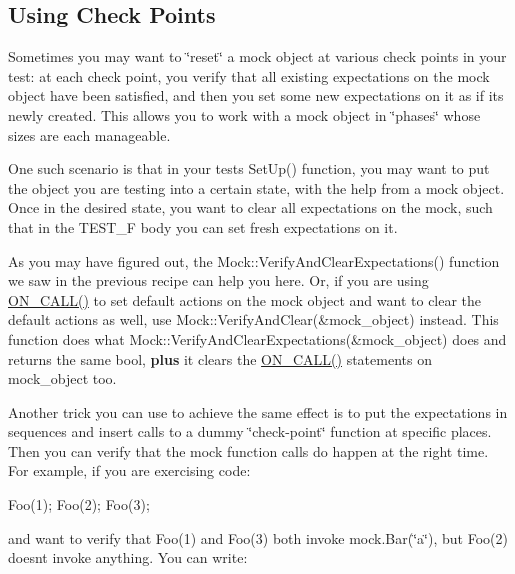 \subsection*{Using Check Points}

Sometimes you may want to \char`\"{}reset\char`\"{} a mock object at various check points in your test\+: at each check point, you verify that all existing expectations on the mock object have been satisfied, and then you set some new expectations on it as if it\textquotesingle{}s newly created. This allows you to work with a mock object in \char`\"{}phases\char`\"{} whose sizes are each manageable.

One such scenario is that in your test\textquotesingle{}s {\ttfamily Set\+Up()} function, you may want to put the object you are testing into a certain state, with the help from a mock object. Once in the desired state, you want to clear all expectations on the mock, such that in the {\ttfamily T\+E\+S\+T\+\_\+F} body you can set fresh expectations on it.

As you may have figured out, the {\ttfamily Mock\+::\+Verify\+And\+Clear\+Expectations()} function we saw in the previous recipe can help you here. Or, if you are using {\ttfamily \hyperlink{gmock-spec-builders_8h_a5b12ae6cf84f0a544ca811b380c37334}{O\+N\+\_\+\+C\+A\+L\+L()}} to set default actions on the mock object and want to clear the default actions as well, use {\ttfamily Mock\+::\+Verify\+And\+Clear(\&mock\+\_\+object)} instead. This function does what {\ttfamily Mock\+::\+Verify\+And\+Clear\+Expectations(\&mock\+\_\+object)} does and returns the same {\ttfamily bool}, {\bfseries plus} it clears the {\ttfamily \hyperlink{gmock-spec-builders_8h_a5b12ae6cf84f0a544ca811b380c37334}{O\+N\+\_\+\+C\+A\+L\+L()}} statements on {\ttfamily mock\+\_\+object} too.

Another trick you can use to achieve the same effect is to put the expectations in sequences and insert calls to a dummy \char`\"{}check-\/point\char`\"{} function at specific places. Then you can verify that the mock function calls do happen at the right time. For example, if you are exercising code\+:


\begin{DoxyCode}
Foo(1);
Foo(2);
Foo(3);
\end{DoxyCode}


and want to verify that {\ttfamily Foo(1)} and {\ttfamily Foo(3)} both invoke {\ttfamily mock.\+Bar(\char`\"{}a\char`\"{})}, but {\ttfamily Foo(2)} doesn\textquotesingle{}t invoke anything. You can write\+:


